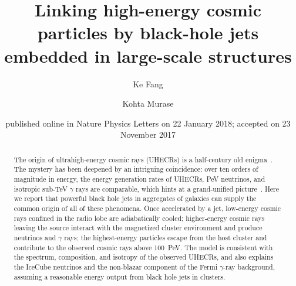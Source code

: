 \documentclass[aps,prd,onecolumn,superscriptaddress,11pt]{revtex4}
\begin{document}


\title{Linking high-energy cosmic particles by black-hole jets\\
embedded in large-scale structures}
\author{Ke Fang}
\author{Kohta Murase}

\date{published online in Nature Physics Letters on 22 January 2018; accepted on 23 November 2017}

\begin{abstract}
The origin of ultrahigh-energy cosmic rays (UHECRs) is a half-century old enigma~\cite{PhysRevLett.10.146}. The mystery has been deepened by an intriguing coincidence: over ten orders of magnitude in energy, the energy generation rates of UHECRs, PeV neutrinos, and isotropic sub-TeV $\gamma$ rays are comparable, which hints at a grand-unified picture~\cite{2016PhRvD..94j3006M}. Here we report that powerful black hole jets in aggregates of galaxies can supply the common origin of all of these phenomena. Once accelerated by a jet, low-energy cosmic rays confined in the radio lobe are adiabatically cooled; higher-energy cosmic rays leaving the source interact with the magnetized cluster environment and produce neutrinos and $\gamma$ rays; the highest-energy particles escape from the host cluster and contribute to the observed cosmic rays above 100~PeV. The model is consistent with the spectrum, composition, and isotropy of the observed UHECRs, and also explains the IceCube neutrinos and the non-blazar component of the Fermi $\gamma$-ray background, assuming a reasonable energy output from black hole jets in clusters. 
\end{abstract}

\maketitle
\end{document}
